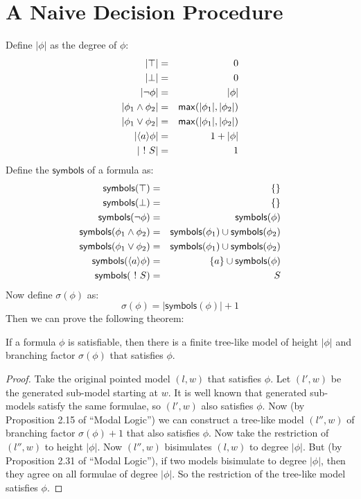 \section{A Naive Decision Procedure}
Define $|\phi|$ as the degree of $\phi$:
\begin{eqnarray}
|\top| & = & 0 \nonumber \\
|\bot| & = & 0 \nonumber \\
|\neg \phi| & = & | \phi | \nonumber \\
|\phi_1 \land \phi_2| & = & \mathsf{max}(| \phi_1 |, | \phi_2|) \nonumber \\
|\phi_1 \lor \phi_2| & = & \mathsf{max}(| \phi_1 |, | \phi_2|) \nonumber \\
|\langle a \rangle \phi | & = & 1 + | \phi | \nonumber \\
| \ ! \  S | & = & 1 \nonumber
\end{eqnarray}
Define the $\mathsf{symbols}$ of a formula as:
\begin{eqnarray}
\mathsf{symbols}(\top) & = & \{\} \nonumber \\
\mathsf{symbols}(\bot) & = & \{\} \nonumber \\
\mathsf{symbols}(\neg \phi) & = & \mathsf{symbols}(\phi) \nonumber \\
\mathsf{symbols}(\phi_1 \land \phi_2) & = &\mathsf{symbols}(\phi_1) \cup \mathsf{symbols}(\phi_2) \nonumber \\
\mathsf{symbols}(\phi_1 \lor \phi_2) & = &\mathsf{symbols}(\phi_1) \cup \mathsf{symbols}(\phi_2) \nonumber \\
\mathsf{symbols}(\langle a \rangle \phi) & = & \{a\} \cup \mathsf{symbols}(\phi) \nonumber \\
\mathsf{symbols}(\ ! \  S) & = & S \nonumber
\end{eqnarray}
Now define $\sigma(\phi)$ as:
\[
\sigma(\phi) = |\mathsf{symbols}(\phi)| + 1
\]
Then we can prove the following theorem:

\begin{theorem}
If a formula $\phi$ is satisfiable, then there is a finite tree-like model of height $|\phi|$ and branching factor $\sigma(\phi)$ that satisfies $\phi$.
\end{theorem}
\begin{proof}
Take the original pointed model $(l,w)$ that satisfies $\phi$.
Let $(l',w)$ be the generated sub-model starting at $w$. 
It is well known that generated sub-models satisfy the same formulae, so $(l',w)$ also satisfies $\phi$.
Now (by Proposition 2.15 of ``Modal Logic'') we can construct a tree-like model $(l'',w)$ of branching factor $\sigma(\phi)+1$ that also satisfies $\phi$.
Now take the restriction of $(l'',w)$ to height $|\phi|$.
Now $(l'',w)$ bisimulates $(l,w)$ to degree $|\phi|$.
But (by Proposition 2.31 of ``Modal Logic''), if two models bisimulate to degree $|\phi|$, then they agree on all formulae of degree $|\phi|$. So the restriction of the tree-like model satisfies $\phi$.
\end{proof}

